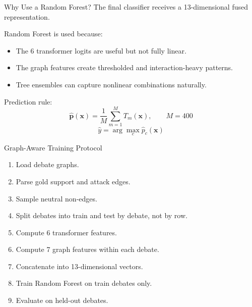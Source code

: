 \documentclass[aspectratio=169]{beamer}
\begin{document}
\begin{frame}[shrink=3]{Why Use a Random Forest?}
The final classifier receives a 13-dimensional fused representation.

Random Forest is used because:
\begin{itemize}
  \item The 6 transformer logits are useful but not fully linear.
  \item The graph features create thresholded and interaction-heavy patterns.
  \item Tree ensembles can capture nonlinear combinations naturally.
\end{itemize}

Prediction rule:
\[
\hat{\mathbf{p}}(\mathbf{x}) = \frac{1}{M}\sum_{m=1}^{M} T_m(\mathbf{x}), \qquad M=400
\]
\[
\hat{y} = \arg\max_c \hat{p}_c(\mathbf{x})
\]
\end{frame}

\begin{frame}[shrink=4]{Graph-Aware Training Protocol}
\begin{enumerate}
  \item Load debate graphs.
  \item Parse gold support and attack edges.
  \item Sample neutral non-edges.
  \item Split debates into train and test by debate, not by row.
  \item Compute 6 transformer features.
  \item Compute 7 graph features within each debate.
  \item Concatenate into 13-dimensional vectors.
  \item Train Random Forest on train debates only.
  \item Evaluate on held-out debates.
\end{enumerate}
\end{frame}
\end{document}
